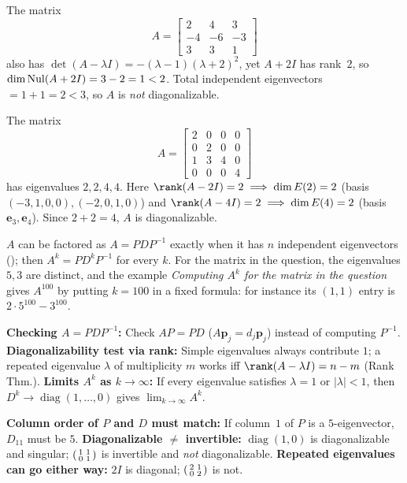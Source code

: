 \documentclass[10pt]{scrartcl}
\newcommand{\vv}[1]{\mathbf{#1}}
\begin{document}
\begin{example*}
The matrix
    \[
      A = \begin{bmatrix}2&4&3\\-4&-6&-3\\3&3&1\end{bmatrix}
    \]
    also has $\det(A-\lambda I)=-(\lambda-1)(\lambda+2)^2$, yet $A+2I$ has rank~$2$, so $\dim\operatorname{Nul}(A+2I)=3-2=1<2$. Total independent eigenvectors $=1+1=2<3$, so $A$ is \emph{not} diagonalizable.
\end{example*}

\begin{example*}
The matrix
    \[
      A = \begin{bmatrix}2&0&0&0\\0&2&0&0\\1&3&4&0\\0&0&0&4\end{bmatrix}
    \]
    has eigenvalues $2,2,4,4$. Here $\rank(A-2I)=2 \implies \dim E(2)=2$ (basis $(-3,1,0,0),(-2,0,1,0)$) and $\rank(A-4I)=2 \implies \dim E(4)=2$ (basis $\vv e_3,\vv e_4$). Since $2+2=4$, $A$ is diagonalizable.
\end{example*}

\revisit
$A$ can be factored as $A=PDP^{-1}$ exactly when it has $n$ independent eigenvectors (); then $A^k=PD^kP^{-1}$ for every $k$. For the matrix in the question, the eigenvalues $5,3$ are distinct, and the example \emph{Computing $A^k$ for the matrix in the question} gives $A^{100}$ by putting $k=100$ in a fixed formula: for instance its $(1,1)$ entry is $2\cdot5^{100}-3^{100}$.

\begin{shortcuts}
  \ii \textbf{Checking $A=PDP^{-1}$:} Check $AP=PD$ ($A\vv p_j=d_j\vv p_j$) instead of computing $P^{-1}$.
  \ii \textbf{Diagonalizability test via rank:} Simple eigenvalues always contribute $1$; a repeated eigenvalue $\lambda$ of multiplicity $m$ works iff $\rank(A-\lambda I)=n-m$ (Rank Thm.).
  \ii \textbf{Limits $A^k$ as $k\to\infty$:} If every eigenvalue satisfies $\lambda=1$ or $|\lambda|<1$, then $D^k\to\operatorname{diag}(1,\dots,0)$ gives $\lim_{k\to\infty}A^k$.
\end{shortcuts}

\begin{trapbox}
  \ii \textbf{Column order of $P$ and $D$ must match:} If column~$1$ of $P$ is a $5$-eigenvector, $D_{11}$ must be $5$.
  \ii \textbf{Diagonalizable $\neq$ invertible:} $\operatorname{diag}(1,0)$ is diagonalizable and singular; $\begin{psmallmatrix}1&1\\0&1\end{psmallmatrix}$ is invertible and \emph{not} diagonalizable.
  \ii \textbf{Repeated eigenvalues can go either way:} $2I$ is diagonal; $\begin{psmallmatrix}2&1\\0&2\end{psmallmatrix}$ is not.
\end{trapbox}
\end{document}
